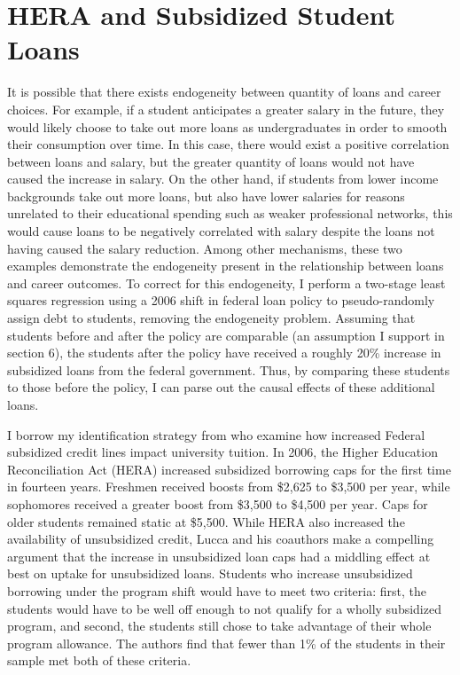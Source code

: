 \documentclass{article}
\begin{document}
	\section{HERA and Subsidized Student Loans}
	
	It is possible that there exists endogeneity between quantity of loans and career choices. For example, if a student anticipates a greater salary in the future, they would likely choose to take out more loans as undergraduates in order to smooth their consumption over time. In this case, there would exist a positive correlation between loans and salary, but the greater quantity of loans would not have caused the increase in salary. On the other hand, if students from lower income backgrounds take out more loans, but also have lower salaries for reasons unrelated to their educational spending such as weaker professional networks, this would cause loans to be negatively correlated with salary despite the loans not having caused the salary reduction. Among other mechanisms, these two examples demonstrate the endogeneity present in the relationship between loans and career outcomes. To correct for this endogeneity, I perform a two-stage least squares regression using a 2006 shift in federal loan policy to pseudo-randomly assign debt to students, removing the endogeneity problem. Assuming that students before and after the policy are comparable (an assumption I support in section 6), the students after the policy have received a roughly 20\% increase in subsidized loans from the federal government. Thus, by comparing these students to those before the policy, I can parse out the causal effects of these additional loans.
	
	I borrow my identification strategy from \textcite{lucca2018} who examine how increased Federal subsidized credit lines impact university tuition. In 2006, the Higher Education Reconciliation Act (HERA) increased subsidized borrowing caps for the first time in fourteen years. Freshmen received boosts from \$2,625 to \$3,500 per year, while sophomores received a greater boost from \$3,500 to \$4,500 per year. Caps for older students remained static at \$5,500. While HERA also increased the availability of unsubsidized credit, Lucca and his coauthors make a compelling argument that the increase in unsubsidized loan caps had a middling effect at best on uptake for unsubsidized loans. Students who increase unsubsidized borrowing under the program shift would have to meet two criteria: first, the students would have to be well off enough to not qualify for a wholly subsidized program, and second, the students still chose to take advantage of their whole program allowance. The authors find that fewer than 1\% of the students in their sample met both of these criteria.
	
\end{document}
